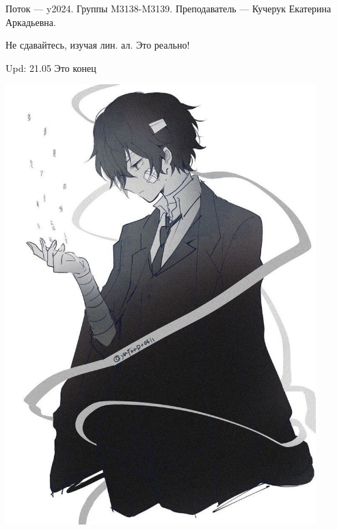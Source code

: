 Поток — y2024.\newline
Группы M3138-M3139.\newline
Преподаватель --- Кучерук Екатерина Аркадьевна.\par

Не сдавайтесь, изучая лин. ал. Это реально!

Upd: 21.05 Это конец
\begin{center}
   \includegraphics[height=17cm]{assets/dazaichock.jpg}
\end{center}